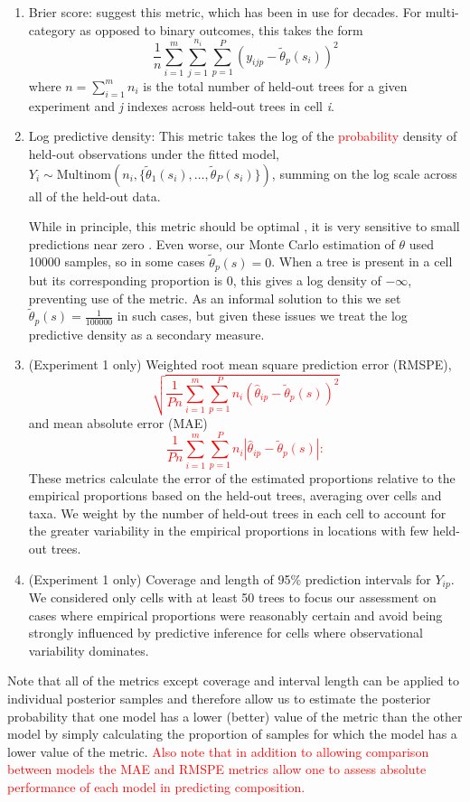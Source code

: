 \documentclass[10pt,letterpaper]{article}
\begin{document}
\begin{enumerate}
\item Brier score: \cite{Gnei:etal:2007} suggest this metric, which has
been in use for decades. For multi-category as opposed to binary outcomes,
this takes the form
\[
\frac{1}{n}\sum_{i=1}^{m}\sum_{j=1}^{n_{i}}\sum_{p=1}^{P}(y_{ijp}-\tilde{\theta}_{p}(s_{i}))^{2}
\]
where $n=\sum_{i=1}^{m}n_{i}$ is the total number of held-out trees
for a given experiment and \emph{j} indexes across held-out trees in cell
\emph{i}. 
\item Log predictive density: This metric takes the log of the \textcolor{red}{probability
}density of held-out observations under the fitted model, $Y_{i}\sim\mbox{Multinom}(n_{i},\{\tilde{\theta}_{1}(s_{i}),\ldots,\tilde{\theta}_{P}(s_{i})\})$,
summing on the log scale across all of the held-out data. 


While in principle, this metric should be optimal \cite{Krnj:Drap:2014},
it is very sensitive to small predictions near zero \cite{Gnei:etal:2007}.
Even worse, our Monte Carlo estimation of $\theta$ used 10000 samples,
so in some cases $\tilde{\theta}_{p}(s)=0$. When a tree is present
in a cell but its corresponding proportion is 0, this gives a log
density of $-\infty$, preventing use of the metric. As an informal
solution to this we set $\tilde{\theta}_{p}(s)=\frac{1}{100000}$
in such cases, but given these issues we treat the log predictive
density as a secondary measure.

\item (Experiment 1 only) Weighted root mean square prediction error (RMSPE),
\textcolor{red}{
\[
\sqrt{\frac{1}{Pn}\sum_{i=1}^{m}\sum_{p=1}^{P}n_{i}(\hat{\theta}_{ip}-\tilde{\theta}_{p}(s))^{2}}
\]
}and mean absolute error (MAE)\textcolor{red}{
\[
\frac{1}{Pn}\sum_{i=1}^{m}\sum_{p=1}^{P}n_{i}|\hat{\theta}_{ip}-\tilde{\theta}_{p}(s)|:
\]
}These metrics calculate the error of the estimated proportions relative
to the empirical proportions based on the held-out trees, averaging
over cells and taxa. We weight by the number of held-out trees in
each cell to account for the greater variability in the empirical
proportions in locations with few held-out trees. 
\item (Experiment 1 only) Coverage and length of 95\% prediction intervals
for $Y_{ip}$. We considered only cells with at least 50 trees to
focus our assessment on cases where empirical proportions were reasonably
certain and avoid being strongly influenced by predictive inference
for cells where observational variability dominates.
\end{enumerate}
Note that all of the metrics except coverage and interval length can
be applied to individual posterior samples and therefore allow us
to estimate the posterior probability that one model has a lower (better)
value of the metric than the other model by simply calculating the
proportion of samples for which the model has a lower value of the
metric. \textcolor{red}{Also note that in addition to allowing comparison
between models the MAE and RMSPE metrics allow one to assess absolute
performance of each model in predicting composition.}
\end{document}
